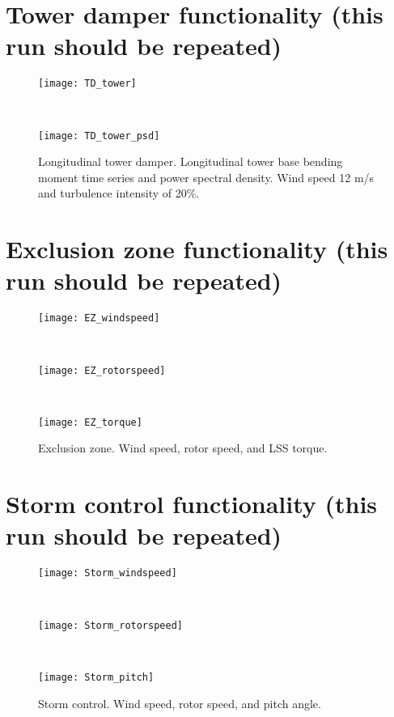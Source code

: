 \clearpage

\section{Tower damper functionality (this run should be repeated)}

\begin{figure}[b]
\begin{center}
\parbox{0.9\columnwidth}{\mbox{\texttt{[image: TD\_tower]}}}\\
\parbox{0.9\columnwidth}{\mbox{\texttt{[image: TD\_tower\_psd]}}}
\caption{Longitudinal tower damper. Longitudinal tower base bending moment time series and power spectral density. Wind speed 12 m/s and turbulence intensity of 20\%.}\label{f:TT_damper}
\end{center}
\end{figure}

\clearpage

\section{Exclusion zone functionality (this run should be repeated)}

\begin{figure}[b]
\begin{center}
\parbox{0.9\columnwidth}{\mbox{\texttt{[image: EZ\_windspeed]}}}\\
\parbox{0.9\columnwidth}{\mbox{\texttt{[image: EZ\_rotorspeed]}}}\\
\parbox{0.9\columnwidth}{\mbox{\texttt{[image: EZ\_torque]}}}
\caption{Exclusion zone. Wind speed, rotor speed, and LSS torque.}\label{f:EZ}
\end{center}
\end{figure}

\clearpage

\section{Storm control functionality (this run should be repeated)}

\begin{figure}[b]
\begin{center}
\parbox{0.9\columnwidth}{\mbox{\texttt{[image: Storm\_windspeed]}}}\\
\parbox{0.9\columnwidth}{\mbox{\texttt{[image: Storm\_rotorspeed]}}}\\
\parbox{0.9\columnwidth}{\mbox{\texttt{[image: Storm\_pitch]}}}
\caption{Storm control. Wind speed, rotor speed, and pitch angle.}\label{f:StormControl}
\end{center}
\end{figure}